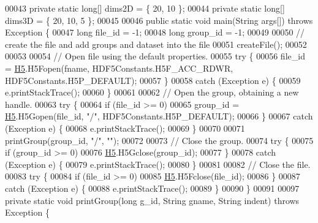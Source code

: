 \begin{DoxyCode}
00043     \textcolor{keyword}{private} \textcolor{keyword}{static} \textcolor{keywordtype}{long}[] dims2D = \{ 20, 10 \};
00044     \textcolor{keyword}{private} \textcolor{keyword}{static} \textcolor{keywordtype}{long}[] dims3D = \{ 20, 10, 5 \};
00045 
00046     \textcolor{keyword}{public} \textcolor{keyword}{static} \textcolor{keywordtype}{void} main(String args[]) \textcolor{keywordflow}{throws} Exception \{
00047         \textcolor{keywordtype}{long} file\_id = -1;
00048         \textcolor{keywordtype}{long} group\_id = -1;
00049 
00050         \textcolor{comment}{// create the file and add groups and dataset into the file}
00051         createFile();
00052 
00053 
00054         \textcolor{comment}{// Open file using the default properties.}
00055         \textcolor{keywordflow}{try} \{
00056             file\_id = \hyperlink{namespace_h5}{H5}.H5Fopen(fname, HDF5Constants.H5F\_ACC\_RDWR, HDF5Constants.H5P\_DEFAULT);
00057         \}
00058         \textcolor{keywordflow}{catch} (Exception e) \{
00059             e.printStackTrace();
00060         \}
00061 
00062         \textcolor{comment}{// Open the group, obtaining a new handle.}
00063         \textcolor{keywordflow}{try} \{
00064             \textcolor{keywordflow}{if} (file\_id >= 0)
00065                 group\_id = \hyperlink{namespace_h5}{H5}.H5Gopen(file\_id, \textcolor{stringliteral}{"/"}, HDF5Constants.H5P\_DEFAULT);
00066         \}
00067         \textcolor{keywordflow}{catch} (Exception e) \{
00068             e.printStackTrace();
00069         \}
00070 
00071         printGroup(group\_id, \textcolor{stringliteral}{"/"}, \textcolor{stringliteral}{""});
00072 
00073         \textcolor{comment}{// Close the group.}
00074         \textcolor{keywordflow}{try} \{
00075             \textcolor{keywordflow}{if} (group\_id >= 0)
00076                 \hyperlink{namespace_h5}{H5}.H5Gclose(group\_id);
00077         \}
00078         \textcolor{keywordflow}{catch} (Exception e) \{
00079             e.printStackTrace();
00080         \}
00081 
00082         \textcolor{comment}{// Close the file.}
00083         \textcolor{keywordflow}{try} \{
00084             \textcolor{keywordflow}{if} (file\_id >= 0)
00085                 \hyperlink{namespace_h5}{H5}.H5Fclose(file\_id);
00086         \}
00087         \textcolor{keywordflow}{catch} (Exception e) \{
00088             e.printStackTrace();
00089         \}
00090     \}
00091 
00097     \textcolor{keyword}{private} \textcolor{keyword}{static} \textcolor{keywordtype}{void} printGroup(\textcolor{keywordtype}{long} g\_id, String gname, String indent) \textcolor{keywordflow}{throws} Exception \{

\end{DoxyCode}
